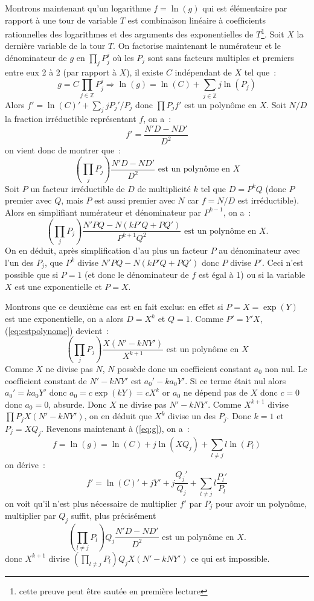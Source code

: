 \documentclass[a4paper,11pt]{article}
\newcommand{\Z}{{\mathbb{Z}}}
\begin{document}
Montrons maintenant qu'un logarithme $f=\ln(g)$ qui est élémentaire
par rapport à une tour de variable $T$ est combinaison linéaire à
coefficients rationnelles des logarithmes et des arguments
des exponentielles de $T$\footnote{cette preuve peut être sautée en première
lecture}.
Soit $X$ la dernière variable de la tour $T$.
On factorise maintenant le numérateur et le dénominateur de $g$ en
$\prod_j P_j^j$ où les $P_j$ sont sans facteurs multiples et 
premiers entre eux 2 à 2 (par rapport à $X$), il existe
$C$ indépendant de $X$ tel que~:
\begin{equation} \label{eq:g}
 g=C\prod_{j \in \Z} P_j ^{j} \Rightarrow 
\ln(g)=\ln(C)+\sum_{j \in \Z} j \ln(P_j)
\end{equation}
Alors $f'=\ln(C)'+\sum_j j P_j'/P_j$ donc $\prod P_j f'$ est un 
polynôme en $X$. 
Soit $N/D$ la fraction irréductible représentant $f$, on a~:
\[ f'=\frac{N' D -N D'}{D^2}\]
on vient donc de montrer que~:
\begin{equation} \label{eq:prodpj}
\left(\prod_j P_j \right) \frac{N' D - N D'}{D^2} 
\mbox{ est un polynôme en $X$}
\end{equation}
Soit $P$ un facteur irréductible de $D$ de multiplicité
$k$ tel que $D=P^k Q$ (donc $P$ premier avec $Q$, mais $P$ est aussi
premier avec $N$ car $f=N/D$ est irréductible). Alors en simplifiant
numérateur et dénominateur par $P^{k-1}$, on a~:
\begin{equation} \label{eq:estpolynome}
 \left( \prod_j P_j \right) \frac{N' P Q - N (kP'Q+PQ')}{ P^{k+1} Q^2} 
\mbox{ est un polynôme en $X$.} 
\end{equation}
On en déduit, après simplification d'au plus un facteur $P$ au dénominateur 
avec l'un des $P_j$, que $P^{k}$ divise 
$N' P Q - N (kP'Q+PQ')$ donc $P$ divise $P'$. Ceci n'est possible
que si $P=1$ (et donc le dénominateur de $f$ est égal à 1) 
ou si la variable $X$ est une exponentielle et $P=X$.

Montrons que ce deuxième cas est en fait exclus:
en effet si $P=X=\exp(Y)$ est une exponentielle, on a alors 
$D=X^k$ et $Q=1$.
Comme $P'=Y'X$, (\ref{eq:estpolynome}) devient~:
\[ \left( \prod_j P_j \right) \frac{X (N' - k N Y' )}{X^{k+1}}
\mbox{ est un polynôme en $X$} \]
Comme $X$ ne divise pas $N$, $N$ possède donc un coefficient constant 
$a_0$ non nul. Le coefficient constant de $N'-kNY'$ est $a_0'-ka_0 Y'$. 
Si ce terme était nul alors $a_0'=ka_0 Y'$ donc $a_0=c \exp(kY)=cX^k$ 
or $a_0$ ne dépend pas de $X$ donc $c=0$ donc $a_0=0$, absurde. 
Donc $X$ ne divise pas $N'-kNY'$.
Comme $X^{k+1}$ divise $ \prod P_j X (N' - k N Y' )$, on en déduit que
$X^k$ divise un des $P_j$. Donc $k=1$ et $P_j=XQ_j$. 
Revenons maintenant à (\ref{eq:g}), on a~:
\[  f=\ln(g) = \ln(C)+j \ln(XQ_j)+ \sum_{l \neq j} l \ln(P_l) \]
on dérive~:
\[ f'=\ln(C)'+jY'+j\frac{Q_j'}{Q_j}+\sum_{l \neq j} l \frac{P_l'}{P_l}\]
on voit qu'il n'est plus nécessaire de multiplier $f'$ par $P_j$
pour avoir un polynôme, multiplier par $Q_j$ suffit, plus précisément
\[ 
\left( \prod_{l \neq j} P_l \right) Q_j \frac{N' D - N D'}{D^2} 
\mbox{ est un polynôme en $X$.} 
\]
donc $X^{k+1}$ divise  
$ \left(\prod_{l \neq j}P_l \right) Q_j X (N' - k N Y' )$ 
ce qui est impossible.
\end{document}
